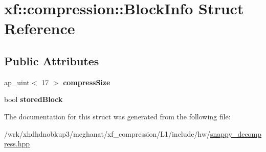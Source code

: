 \hypertarget{structxf_1_1compression_1_1BlockInfo}{\section{xf\-:\-:compression\-:\-:Block\-Info Struct Reference}
\label{structxf_1_1compression_1_1BlockInfo}
}
\subsection*{Public Attributes}
\begin{DoxyCompactItemize}
\item 
\hypertarget{structxf_1_1compression_1_1BlockInfo_a5a047270fafd37883e9864301ba875ce}{ap\-\_\-uint$<$ 17 $>$ {\bfseries compress\-Size}}\label{structxf_1_1compression_1_1BlockInfo_a5a047270fafd37883e9864301ba875ce}

\item 
\hypertarget{structxf_1_1compression_1_1BlockInfo_a7441cde438d96163a8dc49e8b0682c92}{bool {\bfseries stored\-Block}}\label{structxf_1_1compression_1_1BlockInfo_a7441cde438d96163a8dc49e8b0682c92}

\end{DoxyCompactItemize}


The documentation for this struct was generated from the following file\-:\begin{DoxyCompactItemize}
\item 
/wrk/xhdhdnobkup3/meghanat/xf\-\_\-compression/\-L1/include/hw/\hyperlink{snappy__decompress_8hpp}{snappy\-\_\-decompress.\-hpp}\end{DoxyCompactItemize}
